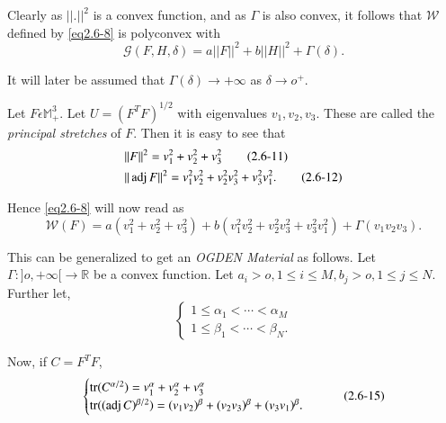 Clearly as $|| .||^2$ is a convex function, and as $\Gamma$ is also
convex, it follows that $\mathcal{W}$ defined by \eqref{eq2.6-8} is
polyconvex with 
\begin{equation*}
\mathcal{G}(F,H,\delta)
=a||F||^2+b||H||^2+\Gamma(\delta). \tag{2.6-10}\label{eq2.6-10} 
\end{equation*}

\begin{remark}\label{chap2-rem2.6.1}%
It will later be assumed that $\Gamma(\delta)\to +\infty$ as
$\delta \to o^+$. 
\end{remark}

Let $F \epsilon \mathbb{M}^3_+$. Let $U=(F^TF)^{1/2}$ with
eigenvalues $v_1,v_2,v_3$. These are called the \textit{principal
  stretches} of $F$. Then it is easy to see that 
\begin{align*}
  & ||F||^2=v^2_1+v^2_2+v^2_3 \tag{2.6-11}\label{eq2.6-11}\\
  & ||\operatorname{adj}  F||^2=v^2_1v^2_2 + v^2_2 v^2_3+v^2_3
  v^2_1. \tag{2.6-12}\label{eq2.6-12} 
\end{align*}\pageoriginale

Hence \eqref{eq2.6-8} will now read as
\begin{equation*}
\mathcal{W}(F)=a\left(v^2_1+ v^2_2+ v^2_3\right)+b \left(v^2_1 v^2_2+v^2_2
v^2_3+v^2_3v^2_1\right)+\Gamma(v_1 v_2 v_3). \tag{2.6-13}\label{eq2.6-13} 
\end{equation*}

This can be generalized to get an \textit{OGDEN
Material} as
follows. Let $\Gamma :]o, +\infty [ \to \mathbb{R}$ be a convex
    function. Let $a_i > o, 1 \le i \le M, b_j > o, 1 \le j \le
    N$. Further let, 
\begin{equation*}
  \begin{cases}
    1 \le \alpha_1 < \cdots < \alpha_M \\
    1 \le \beta_1 < \cdots < \beta_N.
  \end{cases}\tag {2.6-14}\label{eq2.6-14}
\end{equation*}

Now, if $C=F^T F$,
\begin{equation*}
  \begin{cases}
    \operatorname{tr}  (C^{\alpha/2})=v^\alpha_1+v^\alpha_2+v^\alpha_3 \\
    \operatorname{tr}  ((\operatorname{adj}  C)^{\beta/2}) = (v_1 v_2)^\beta +(v_2 v_3)^\beta
    +(v_3 v_1)^\beta . 
\end{cases}\tag{2.6-15}\label{eq2.6-15}
\end{equation*}

